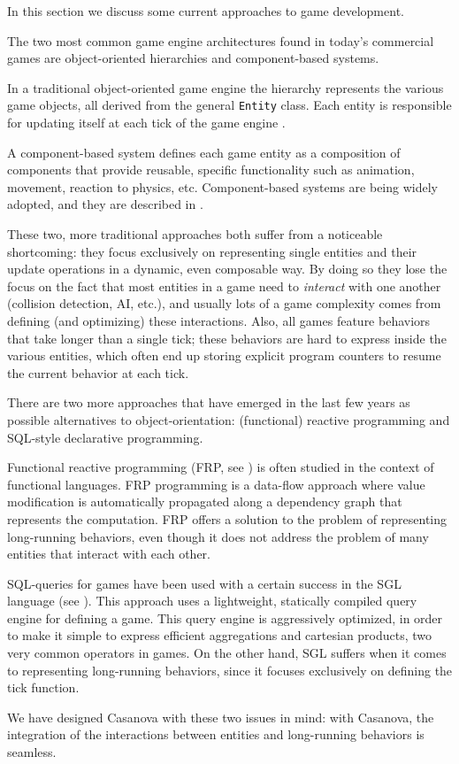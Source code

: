 
In this section we discuss some current approaches to game development.

The two most common game engine architectures found in today's commercial games are object-oriented hierarchies and component-based systems.

In a traditional object-oriented game engine the hierarchy represents the various game objects, all derived from the general \texttt{Entity} class. Each entity is responsible for updating itself at each tick of the game engine \cite{OO_GAME_DEV}.

A component-based system defines each game entity as a composition of components that provide reusable, specific functionality such as animation, movement, reaction to physics, etc. Component-based systems are being widely adopted, and they are described in \cite{COMPONENTS1}.

These two, more traditional approaches both suffer from a noticeable shortcoming: they focus exclusively on representing single entities and their update operations in a dynamic, even composable way. By doing so they lose the focus on the fact that most entities in a game need to \textit{interact} with one another (collision detection, AI, etc.), and usually lots of a game complexity comes from defining (and optimizing) these interactions. Also, all games feature behaviors that take longer than a single tick; these behaviors are hard to express inside the various entities, which often end up storing explicit program counters to resume the current behavior at each tick.

There are two more approaches that have emerged in the last few years as possible alternatives to object-orientation: (functional) reactive programming and SQL-style declarative programming.

Functional reactive programming (FRP, see \cite{FRP}) is often studied in the context of functional languages. FRP programming is a data-flow approach where value modification is automatically propagated along a dependency graph that represents the computation. FRP offers a solution to the problem of representing long-running behaviors, even though it does not address the problem of many entities that interact with each other.

SQL-queries for games have been used with a certain success in the SGL language (see \cite{SCALING_GAMES}). This approach uses a lightweight, statically compiled query engine for defining a game. This query engine is aggressively optimized, in order to make it simple to express efficient aggregations and cartesian products, two very common operators in games. On the other hand, SGL suffers when it comes to representing long-running behaviors, since it focuses exclusively on defining the tick function.

We have designed Casanova with these two issues in mind: with Casanova, the integration of the interactions between entities and long-running behaviors is seamless.